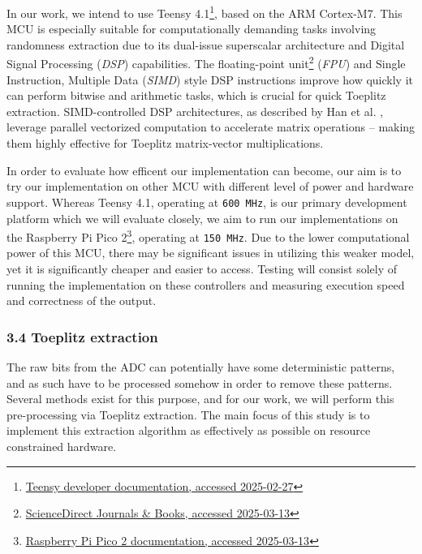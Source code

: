 In our work, we intend to use Teensy 4.1\footnote{\href{https://www.pjrc.com/store/teensy41.html}{Teensy developer documentation, accessed 2025-02-27}}, based on the ARM Cortex-M7. This MCU is especially suitable for computationally demanding tasks involving randomness extraction due to its dual-issue superscalar architecture and Digital Signal Processing (\emph{DSP}) capabilities. The floating-point unit\footnote{\href{https://www.sciencedirect.com/topics/computer-science/floating-point-unit}{ScienceDirect Journals \& Books, accessed 2025-03-13}} (\emph{FPU}) and Single Instruction, Multiple Data (\emph{SIMD}) style DSP instructions improve how quickly it can perform bitwise and arithmetic tasks, which is crucial for quick Toeplitz extraction. SIMD-controlled DSP architectures, as described by Han et al. \cite{simd-dsp}, leverage parallel vectorized computation to accelerate matrix operations -- making them highly effective for Toeplitz matrix-vector multiplications.

In order to evaluate how efficent our implementation can become, our aim is to try our implementation on other MCU with different level of power and hardware support. Whereas Teensy 4.1, operating at \texttt{600\ MHz}, is our primary development platform which we will evaluate closely, we aim to run our implementations on the Raspberry Pi Pico 2\footnote{\href{https://datasheets.raspberrypi.com/pico/pico-2-product-brief.pdf}{Raspberry Pi Pico 2 documentation, accessed 2025-03-13}}, operating at \texttt{150\ MHz}. Due to the lower computational power of this MCU, there may be significant issues in utilizing this weaker model, yet it is significantly cheaper and easier to access. Testing will consist solely of running the implementation on these controllers and measuring execution speed and correctness of the output.

\hypertarget{toeplitz-extraction}{%
\subsubsection{3.4 Toeplitz extraction}\label{toeplitz-extraction}}

The raw bits from the ADC can potentially have some deterministic patterns, and as such have to be processed somehow in order to remove these patterns. Several methods exist for this purpose, and for our work, we will perform this pre-processing via Toeplitz extraction. The main focus of this study is to implement this extraction algorithm as effectively as possible on resource constrained hardware.


